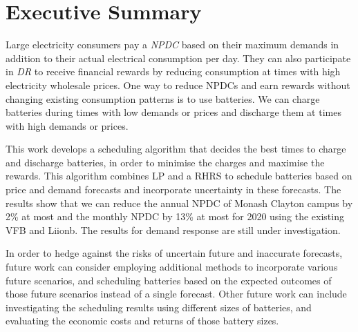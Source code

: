 \section*{Executive Summary}

Large electricity consumers pay a \textit{\acrlong{NPDC}} based on their maximum demands in addition to their actual electrical consumption per day. 
They can also participate in \textit{\acrlong{DR}} to receive financial rewards by reducing consumption at times with high electricity wholesale prices.
One way to reduce \acrlong{NPDC}s and earn rewards without changing existing consumption patterns is to use batteries. We can charge batteries during times with low demands or prices and discharge them at times with high demands or prices. 

This work develops a scheduling algorithm that decides the best times to charge and discharge batteries, in order to minimise the charges and maximise the rewards. This algorithm combines \acrlong{LP} and a \acrlong{RHRS} to schedule batteries based on price and demand forecasts and incorporate uncertainty in these forecasts. The results show that we can reduce the annual \acrlong{NPDC} of Monash Clayton campus by 2\% at most and the monthly \acrlong{NPDC} by 13\% at most for 2020 using the existing \acrlong{VFB} and \acrlong{Liionb}. The results for demand response are still under investigation. 

In order to hedge against the risks of uncertain future and inaccurate forecasts, future work can consider employing additional methods to incorporate various future scenarios, and scheduling batteries based on the expected outcomes of those future scenarios instead of a single forecast. Other future work can include investigating the scheduling results using different sizes of batteries, and evaluating the economic costs and returns of those battery sizes. 


%
%
%
%
%
%

